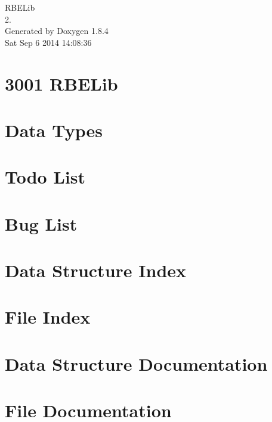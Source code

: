 \documentclass[twoside]{book}
\newcommand{\clearemptydoublepage}{%
  \newpage{\pagestyle{empty}\cleardoublepage}%
}
\begin{document}
\hypersetup{pageanchor=false}
\begin{titlepage}
\vspace*{7cm}
\begin{center}%
{\Large R\-B\-E\-Lib \\[1ex]\large 2. }\\
\vspace*{1cm}
{\large Generated by Doxygen 1.8.4}\\
\vspace*{0.5cm}
{\small Sat Sep 6 2014 14:08:36}\\
\end{center}
\end{titlepage}
\clearemptydoublepage
\tableofcontents
\clearemptydoublepage
{}
\hypersetup{pageanchor=true}

\chapter{3001 R\-B\-E\-Lib}
\label{index}\hypertarget{index}{}
\chapter{Data Types}
\label{datatypes}
\hypertarget{datatypes}{}

\chapter{Todo List}
\label{todo}
\hypertarget{todo}{}

\chapter{Bug List}
\label{bug}
\hypertarget{bug}{}

\chapter{Data Structure Index}

\chapter{File Index}

\chapter{Data Structure Documentation}



\chapter{File Documentation}




















\newpage
{}
{}
\printindex
\end{document}
